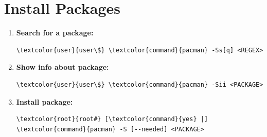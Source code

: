 \documentclass[10pt, a4paper, onecolumn, oneside, titlepage, openany]{book}
\begin{document}
\section{Install Packages}
\begin{enumerate}
    \item \textbf{Search for a package:}
\begin{Verbatim}[commandchars=\\\{\}]
\textcolor{user}{user\$} \textcolor{command}{pacman} -Ss[q] <REGEX>
\end{Verbatim}
    \item \textbf{Show info about package:}
\begin{Verbatim}[commandchars=\\\{\}]
\textcolor{user}{user\$} \textcolor{command}{pacman} -Sii <PACKAGE>
\end{Verbatim}
    \item \textbf{Install package:}
\begin{Verbatim}[commandchars=\\\{\}]
\textcolor{root}{root#} [\textcolor{command}{yes} |] \textcolor{command}{pacman} -S [--needed] <PACKAGE>
\end{Verbatim}   
\end{enumerate}
\end{document}

